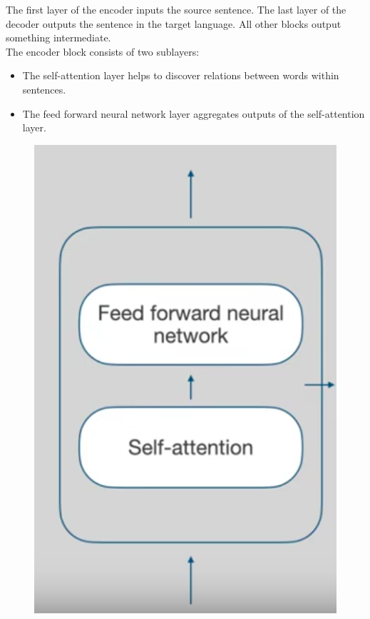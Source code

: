 The first layer of the encoder inputs the source sentence. The last layer of the decoder outputs the sentence in the target language. All other blocks output something intermediate.\\

The encoder block consists of two sublayers:
\begin{itemize}
\item The self-attention layer helps to discover relations between words within sentences.
\item The feed forward neural network layer aggregates outputs of the self-attention layer.
\end{itemize}
\begin{figure}[H]
\centering
\includegraphics[scale=0.2]{encoderblock.png}
\end{figure}

